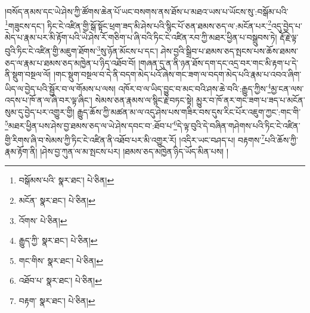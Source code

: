 །བསོད་ནམས་དང་ཡེ་ཤེས་ཀྱི་ཚོགས་ཆེན་པོ་ཡང་བསགས་ནས་ཐོས་པ་མཐའ་ཡས་པ་ཡོངས་སུ་:བསྒོམ་པའི་\footnote{བསྒོམས་པའི་  སྣར་ཐང་།  པེ་ཅིན། }གཟུངས་དང་། ཏིང་ངེ་འཛིན་གྱི་སྒོ་སྟོང་ཕྲག་ཟད་མི་ཤེས་པའི་སྙིང་པོ་ཅན་ཐམས་ཅད་ལ་:མངོན་པར་\footnote{མངོན་  སྣར་ཐང་།  པེ་ཅིན། }འདུ་བྱེད་པ་མེད་པ་རྣམ་པར་མི་རྟོག་པའི་ཡེ་ཤེས་རོ་གཅིག་པ་ཞི་བའི་ཏིང་ངེ་འཛིན་རབ་ཀྱི་མཐར་ཕྱིན་པ་བསྒྲུབས་ཏེ། རྡོ་རྗེ་ལྟ་བུའི་ཏིང་ངེ་འཛིན་གྱི་མཇུག་ཐོགས་\footnote{འོགས་  པེ་ཅིན། }སུ་ཉོན་མོངས་པ་དང་། ཤེས་བྱའི་སྒྲིབ་པ་ཐམས་ཅད་སྤངས་པས་ཆོས་ཐམས་ཅད་ལ་རྣམ་པ་ཐམས་ཅད་མཁྱེན་པ་ཉིད་འཐོབ་བོ། །གཞན་དུ་ན་ནི་ཉན་ཐོས་དག་དང་འདྲ་བར་གང་མི་རྟག་པ་དེ་ནི་སྡུག་བསྔལ་ལོ། །གང་སྡུག་བསྔལ་བ་དེ་ནི་བདག་མེད་པའོ་ཞེས་གང་ཟག་ལ་བདག་མེད་པའི་རྣམ་པ་འབའ་ཞིག་ཡིད་ལ་བྱེད་པའི་སྦྱོར་བ་ལ་གོམས་པ་ལས། འཁོར་བ་ལ་ཡིད་བྱུང་བ་མང་བའི་ཤས་ཆེ་བའི་:རྒྱུད་ཀྱིས་\footnote{རྒྱུད་ཀྱི་  སྣར་ཐང་།  པེ་ཅིན། }མྱ་ངན་ལས་འདས་པ་ཁོ་ན་ལ་ཞི་བར་ལྟ་ཞིང་། སེམས་ཅན་རྣམས་ལ་སྙིང་རྗེ་བཏང་སྟེ། མྱུར་བ་ཁོ་ནར་གང་ཟག་པ་ཟད་པ་མངོན་སུམ་དུ་བྱེད་པར་འགྱུར་གྱི། རྒྱུད་ཆོས་ཀྱི་མཚན་མ་ལ་འདུ་ཤེས་པས་གཟིར་བས་དུས་རིང་པོར་འཇུག་ཀྱང་:གང་གི་\footnote{གང་གིས་  སྣར་ཐང་།  པེ་ཅིན། }མཐར་ཕྱིན་པས་ཤེས་བྱ་ཐམས་ཅད་ལ་ཡེ་ཤེས་དབང་བ་:ཐོབ་པ་\footnote{འཐོབ་པ་  སྣར་ཐང་།  པེ་ཅིན། }དེ་ལྟ་བུའི་དེ་བཞིན་གཤེགས་པའི་ཏིང་ངེ་འཛིན་གྱི་རིགས་ཞི་བ་སེམས་ཀྱི་ཏིང་ངེ་འཛིན་ནི་འཐོབ་པར་མི་འགྱུར་རོ། །འདིར་ཡང་བཤད་པ། བརྟགས་\footnote{བརྟག་  སྣར་ཐང་།  པེ་ཅིན། }པའི་ཆོས་ཀྱི་རྣམ་རྟོག་ནི། །ཤེས་བྱ་ཀུན་ལ་མ་སྤངས་པར། །ཐམས་ཅད་མཁྱེན་ཉིད་ཡོད་མིན་པས། །
